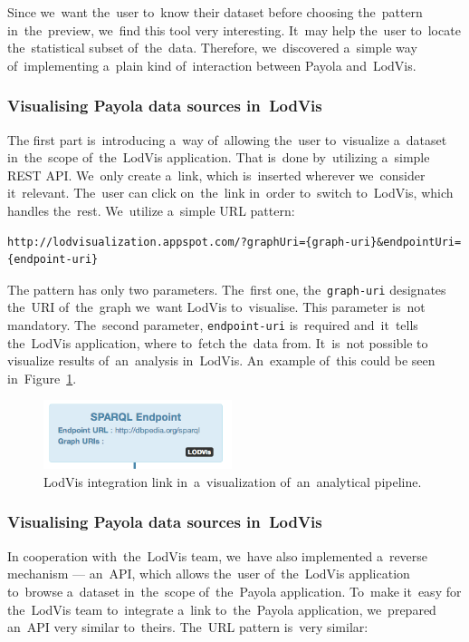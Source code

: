 Since we~want the~user to~know their dataset before choosing the~pattern in~the~preview, we~find this tool very interesting. It~may help the~user to~locate the~statistical subset of~the~data. Therefore, we~discovered a~simple way of~implementing a~plain kind of~interaction between Payola and~LodVis.

\subsubsection{Visualising Payola data sources in~LodVis}
The first part is~introducing a~way of~allowing the~user to~visualize a~dataset in~the~scope of~the~LodVis application. That is~done by~utilizing a~simple REST API. We~only create a~link, which is~inserted wherever we~consider it~relevant. The~user can click on~the~link in~order to~switch to~LodVis,
which handles the~rest. We~utilize a~simple URL pattern:

{  \scriptsize
\begin{verbatim}
http://lodvisualization.appspot.com/?graphUri={graph-uri}&endpointUri={endpoint-uri}
\end{verbatim}
}

The pattern has only two parameters. The~first one, the~\texttt{graph-uri} 
designates the~URI of~the~graph we~want LodVis to~visualise. This parameter is~not mandatory. The~second parameter, \texttt{endpoint-uri} is~required and~it~tells the~LodVis application, where to~fetch the~data from. It~is~not possible 
to visualize results of~an~analysis in~LodVis. An~example of~this could
be seen in~Figure~\ref{fig:lodvis-int}.

\begin{figure}
	\centering
	\includegraphics[width=55mm]{img/lodvis-int.png}
	\caption{LodVis integration link in~a~visualization of~an~analytical pipeline.}
	\label{fig:lodvis-int}
\end{figure}


\subsubsection{Visualising Payola data sources in~LodVis}
In cooperation with~the~LodVis team, we~have also implemented a~reverse 
mechanism --- an~API, which allows the~user of~the~LodVis application to~browse a~dataset in~the~scope of~the~Payola application. To~make it~easy for the~LodVis 
team to~integrate a~link to~the~Payola application, we~prepared an~API very 
similar to~theirs. The~URL pattern is~very similar:

